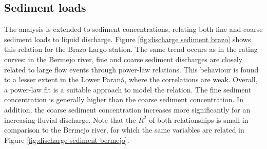 \subsection{Sediment loads}
The analysis is extended to sediment concentrations, relating both fine and coarse sediment loads to liquid discharge. Figure \ref{fig:discharge sediment brazo} shows this relation for the Brazo Largo station. The same trend occurs as in the rating curves: in the Bermejo river, fine and coarse sediment discharges are closely related to large flow events through power-law relations. This behaviour is found to a lesser extent in the Lower Paraná, where the correlations are weak. Overall, a power-law fit is a suitable approach to model the relation. The fine sediment concentration is generally higher than the coarse sediment concentration. In addition, the coarse sediment concentration increases more significantly for an increasing fluvial discharge. Note that the $R^2$ of both relationships is small in comparison to the Bermejo river, for which the same variables are related in Figure \ref{fig:discharge sediment bermejo}. 


